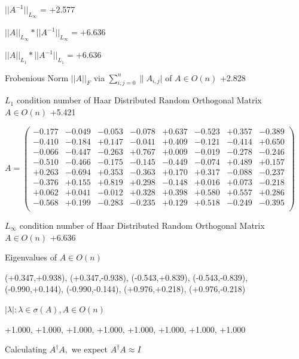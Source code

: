 \documentclass[9pt]{article}
\theoremstyle{plain}
\theoremstyle{definition}
\theoremstyle{remark}
\numberwithin{equation}{section}
\begin{document}
$||A^{-1}||_{L_{\infty}}$ = +2.577

$||A||_{L_{\infty}} * ||A^{-1}||_{L_{\infty}} = +6.636$

$||A||_{L_1} * ||A^{-1}||_{L_1} = +6.636$

Frobenious Norm  $||A||_{\textit{F}}$ via $\sum\limits_{i,j =0}^{n} \|A_{i,j}|$   of  $A \in O(n)$  +2.828

$L_1$ condition number of Haar Distributed Random Orthogonal Matrix $A \in O(n)$ +5.421

$A = \left(
\begin{array}{
cccccccc}
-0.177 & -0.049 & -0.053 & -0.078 & +0.637 & -0.523 & +0.357 & -0.389 \\
-0.410 & -0.184 & +0.147 & -0.041 & +0.409 & -0.121 & -0.414 & +0.650 \\
-0.066 & -0.447 & -0.263 & +0.767 & +0.009 & -0.019 & -0.278 & -0.246 \\
-0.510 & -0.466 & -0.175 & -0.145 & -0.449 & -0.074 & +0.489 & +0.157 \\
+0.263 & -0.694 & +0.353 & -0.363 & +0.170 & +0.317 & -0.088 & -0.237 \\
-0.376 & +0.155 & +0.819 & +0.298 & -0.148 & +0.016 & +0.073 & -0.218 \\
+0.062 & +0.041 & -0.012 & +0.328 & +0.398 & +0.580 & +0.557 & +0.286 \\
-0.568 & +0.199 & -0.283 & -0.235 & +0.129 & +0.518 & -0.249 & -0.395 \\
\end{array}
\right)$ \newline 

$L_{\infty}$ condition number of Haar Distributed Random Orthogonal Matrix $A \in O(n)$ +6.636

Eigenvalues of $A \in O(n)$

(+0.347,+0.938), (+0.347,-0.938), (-0.543,+0.839), (-0.543,-0.839), (-0.990,+0.144), (-0.990,-0.144), (+0.976,+0.218), (+0.976,-0.218)

 $|\lambda | : \lambda \in \sigma(A) , A \in O(n)$

+1.000, +1.000, +1.000, +1.000, +1.000, +1.000, +1.000, +1.000


Calculating $A^{\dag} A,$  we expect $A^{\dag} A \approx I$
\end{document}
